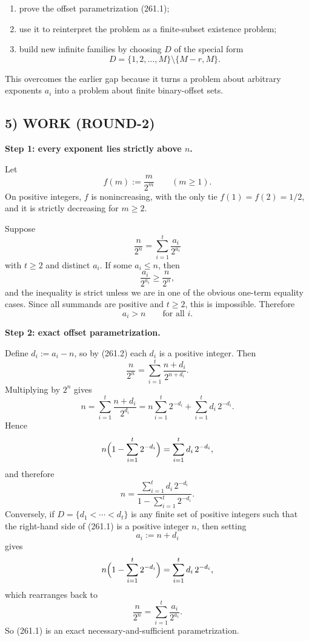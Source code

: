 \begin{enumerate}
\item prove the offset parametrization (261.1);
\item use it to reinterpret the problem as a finite-subset existence problem;
\item build new infinite families by choosing $D$ of the special form
\[
D=\{1,2,\dots,M\}\setminus\{M-r,M\}.
\]
\end{enumerate}

This overcomes the earlier gap because it turns a problem about arbitrary exponents $a_i$ into a problem about finite binary-offset sets.

\subsection*{5) WORK (ROUND-2)}

\medskip
\noindent
\textbf{Step 1: every exponent lies strictly above $n$.}

Let
\[
f(m):=\frac{m}{2^m}\qquad (m\geq 1).
\]
On positive integers, $f$ is nonincreasing, with the only tie $f(1)=f(2)=1/2$, and it is strictly decreasing for $m\geq 2$.

Suppose
\[
\frac{n}{2^n}=\sum_{i=1}^{t}\frac{a_i}{2^{a_i}}
\]
with $t\geq 2$ and distinct $a_i$.
If some $a_i\leq n$, then
\[
\frac{a_i}{2^{a_i}}\geq \frac{n}{2^n},
\]
and the inequality is strict unless we are in one of the obvious one-term equality cases.  Since all summands are positive and $t\geq 2$, this is impossible.  Therefore
\[
a_i>n\qquad\text{for all }i.
\tag{261.2}
\]

\medskip
\noindent
\textbf{Step 2: exact offset parametrization.}

Define $d_i:=a_i-n$, so by (261.2) each $d_i$ is a positive integer.  Then
\[
\frac{n}{2^n}
=
\sum_{i=1}^{t}\frac{n+d_i}{2^{n+d_i}}.
\]
Multiplying by $2^n$ gives
\[
n=\sum_{i=1}^{t}\frac{n+d_i}{2^{d_i}}
=
n\sum_{i=1}^{t}2^{-d_i}+\sum_{i=1}^{t} d_i\,2^{-d_i}.
\]
Hence
\[
n\Bigl(1-\sum_{i=1}^{t}2^{-d_i}\Bigr)=\sum_{i=1}^{t} d_i\,2^{-d_i},
\]
and therefore
\[
n=\frac{\sum_{i=1}^{t} d_i\,2^{-d_i}}{1-\sum_{i=1}^{t}2^{-d_i}}.
\]
Conversely, if $D=\{d_1<\cdots<d_t\}$ is any finite set of positive integers such that the right-hand side of (261.1) is a positive integer $n$, then setting
\[
a_i:=n+d_i
\]
gives
\[
n\Bigl(1-\sum_{i=1}^{t}2^{-d_i}\Bigr)=\sum_{i=1}^{t} d_i\,2^{-d_i},
\]
which rearranges back to
\[
\frac{n}{2^n}=\sum_{i=1}^{t}\frac{a_i}{2^{a_i}}.
\]
So (261.1) is an exact necessary-and-sufficient parametrization.

